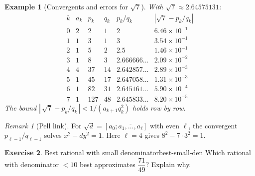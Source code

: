 \documentclass[11pt,a4paper]{article}
\newtheorem{example}{Example}
\theoremstyle{definition}
\newtheorem{exercise}{Exercise} %
\theoremstyle{definition}
\theoremstyle{plain}
\theoremstyle{remark}
\newtheorem{remark}[exercise]{Remark}
\begin{document}
\begin{example}[Convergents and errors for $\sqrt7$]
	With $\sqrt7\approx2.64575131$:
	\[
	\begin{array}{c|c|c|c|c|c}
		k & a_k & p_k & q_k & p_k/q_k & |\sqrt7-p_k/q_k| \\ \hline
		0 & 2 & 2   & 1  & 2                 & 6.46\times10^{-1} \\
		1 & 1 & 3   & 1  & 3                 & 3.54\times10^{-1} \\
		2 & 1 & 5   & 2  & 2.5               & 1.46\times10^{-1} \\
		3 & 1 & 8   & 3  & 2.666666\ldots    & 2.09\times10^{-2} \\
		4 & 4 & 37  & 14 & 2.642857\ldots    & 2.89\times10^{-3} \\
		5 & 1 & 45  & 17 & 2.647058\ldots    & 1.31\times10^{-3} \\
		6 & 1 & 82  & 31 & 2.645161\ldots    & 5.90\times10^{-4} \\
		7 & 1 & 127 & 48 & 2.645833\ldots    & 8.20\times10^{-5}
	\end{array}
	\]
	The bound $|\,\sqrt7-p_k/q_k\,|<1/(a_{k+1}q_k^2)$ holds row by row.
\end{example}

\begin{remark}[Pell link]
	For $\sqrt d=[a_0;\overline{a_1,\dots,a_\ell}]$ with even $\ell$, the convergent $p_{\ell-1}/q_{\ell-1}$
	solves $x^2-dy^2=1$. Here $\ell=4$ gives $8^2-7\cdot3^2=1$.
\end{remark}


\begin{exercise}{Best rational with small denominator}{best-small-den}
	Which rational with denominator $<10$ best approximates $\dfrac{71}{49}$?  Explain why.
\end{exercise}
\end{document}
